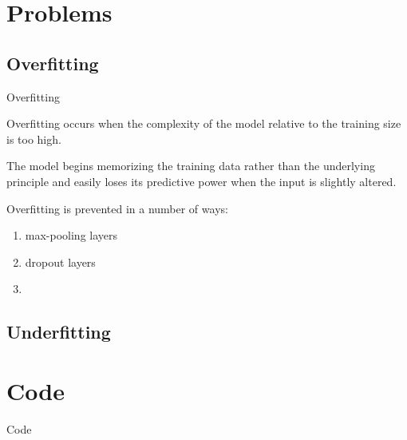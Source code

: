 \documentclass[12pt]{beamer}
\begin{document}
\section{Problems}
\subsection{Overfitting}
\begin{frame} {Overfitting}

Overfitting occurs when the complexity of the model relative to the training size is too high.


The model begins memorizing the training data rather  than the underlying principle and easily loses its predictive power when the input is slightly altered.

Overfitting is prevented in a number of ways:

\begin{enumerate}

\item max-pooling layers
\item dropout layers
\item

\end{enumerate}

\end{frame}

\subsection{Underfitting}
\begin{frame}
\end{frame}
\section{Code}
\begin{frame}{Code}
\end{frame}


\end{document}
